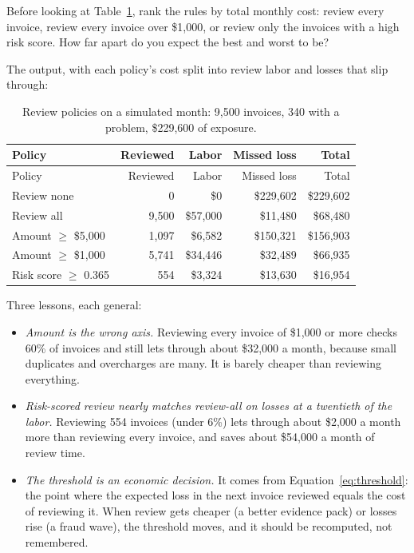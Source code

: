 \begin{thinkabout}
Before looking at Table~\ref{tab:review-policies}, rank the rules by total monthly cost: review every invoice, review every invoice over \$1{,}000, or review only the invoices with a high risk score. How far apart do you expect the best and worst to be?
\end{thinkabout}

The output, with each policy's cost split into review labor and losses that slip through:

\begingroup
\small
\begin{longtable}{@{}lrrrr@{}}
\caption{Review policies on a simulated month: 9{,}500 invoices, 340 with a problem, \$229{,}600 of exposure.}\label{tab:review-policies}\\
\toprule
\rowcolor{coHead} Policy & Reviewed & Labor & Missed loss & Total \\
\midrule
\endfirsthead
\toprule
\rowcolor{coHead} Policy & Reviewed & Labor & Missed loss & Total \\
\midrule
\endhead
Review none & 0 & \$0 & \$229{,}602 & \$229{,}602 \\
Review all & 9{,}500 & \$57{,}000 & \$11{,}480 & \$68{,}480 \\
Amount $\ge$ \$5{,}000 & 1{,}097 & \$6{,}582 & \$150{,}321 & \$156{,}903 \\
Amount $\ge$ \$1{,}000 & 5{,}741 & \$34{,}446 & \$32{,}489 & \$66{,}935 \\
\rowcolor{coGreenBg} Risk score $\ge$ 0.365 & 554 & \$3{,}324 & \$13{,}630 & \$16{,}954 \\
\bottomrule
\end{longtable}
\endgroup

Three lessons, each general:
\begin{itemize}[itemsep=2pt]
  \item \emph{Amount is the wrong axis.} Reviewing every invoice of \$1{,}000 or more checks 60\% of invoices and still lets through about \$32{,}000 a month, because small duplicates and overcharges are many. It is barely cheaper than reviewing everything.
  \item \emph{Risk-scored review nearly matches review-all on losses at a twentieth of the labor.} Reviewing 554 invoices (under 6\%) lets through about \$2{,}000 a month more than reviewing every invoice, and saves about \$54{,}000 a month of review time.
  \item \emph{The threshold is an economic decision.} It comes from Equation~\eqref{eq:threshold}: the point where the expected loss in the next invoice reviewed equals the cost of reviewing it. When review gets cheaper (a better evidence pack) or losses rise (a fraud wave), the threshold moves, and it should be recomputed, not remembered.
\end{itemize}

